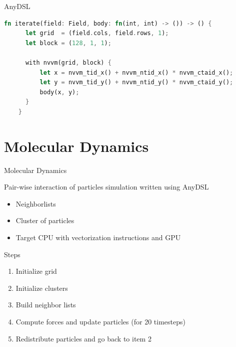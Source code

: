 \documentclass[aspectratio=43,t]{beamer}
\begin{document}
  \begin{frame}[fragile]{AnyDSL}
    \begin{lstlisting}[language=Rust]
    fn iterate(field: Field, body: fn(int, int) -> ()) -> () {
      let grid  = (field.cols, field.rows, 1);
      let block = (128, 1, 1);

      with nvvm(grid, block) {
          let x = nvvm_tid_x() + nvvm_ntid_x() * nvvm_ctaid_x();
          let y = nvvm_tid_y() + nvvm_ntid_y() * nvvm_ctaid_y();
          body(x, y);
      }
    }
    \end{lstlisting}
  \end{frame}

  \section{Molecular Dynamics}
  \begin{frame}{Molecular Dynamics}
    \begin{block}{Pair-wise interaction of particles simulation written using AnyDSL}
      \begin{itemize}
        \item Neighborlists
        \item Cluster of particles
        \item Target CPU with vectorization instructions and GPU
      \end{itemize}
    \end{block}

    \pause

    \begin{block}{Steps}
      \begin{enumerate}
        \item<1-> Initialize grid
        \item<2-> Initialize clusters
        \item<3-> Build neighbor lists
        \item<4-> Compute forces and update particles (for 20 timesteps)
        \item<5-> Redistribute particles and go back to item 2
      \end{enumerate}
    \end{block}
  \end{frame}
\end{document}
